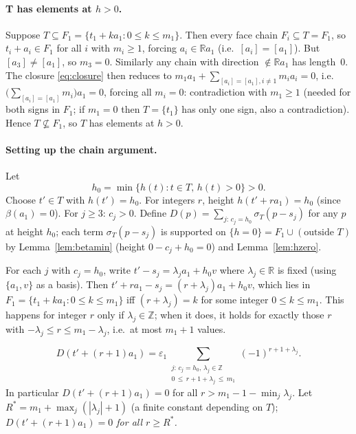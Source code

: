 \paragraph{T has elements at $h>0$.}
Suppose $T\subseteq F_1=\{t_1+ka_1:0\le k\le m_1\}$.
Then every face chain $F_i\subseteq T=F_1$, so
$t_i+a_i\in F_1$ for all $i$ with $m_i\ge1$, forcing $a_i\in\mathbb{R}a_1$ (i.e.\ $[a_i]=[a_1]$).
But $[a_3]\ne[a_1]$, so $m_3=0$.  Similarly any chain with direction $\not\in\mathbb{R}a_1$ has length~$0$.
The closure \eqref{eq:closure} then reduces to $m_1 a_1+\sum_{[a_i]=[a_1],i\ne1}m_i a_i=0$,
i.e.\ $\bigl(\sum_{[a_i]=[a_1]}m_i\bigr)a_1=0$, forcing all $m_i=0$: contradiction with $m_1\ge1$
(needed for both signs in $F_1$; if $m_1=0$ then $T=\{t_1\}$ has only one sign, also a contradiction).
Hence $T\not\subseteq F_1$, so $T$ has elements at $h>0$.

\paragraph{Setting up the chain argument.}
Let
\[
  h_0=\min\{h(t):t\in T,\,h(t)>0\}>0.
\]
Choose $t'\in T$ with $h(t')=h_0$.
For integers $r$, height $h(t'+ra_1)=h_0$ (since $\beta(a_1)=0$).
For $j\ge3$: $c_j>0$.
Define $D(p)=\sum_{j:\,c_j=h_0}\sigma_T(p-s_j)$ for any $p$ at height $h_0$;
each term $\sigma_T(p-s_j)$ is supported on $\{h=0\}=F_1\cup(\text{outside }T)$
by Lemma~\ref{lem:betamin} (height $0-c_j+h_0=0$) and Lemma~\ref{lem:hzero}.

For each $j$ with $c_j=h_0$, write $t'-s_j=\lambda_j a_1+h_0 v$ where
$\lambda_j\in\mathbb{R}$ is fixed (using $\{a_1,v\}$ as a basis).
Then $t'+ra_1-s_j=(r+\lambda_j)a_1+h_0 v$, which lies in
$F_1=\{t_1+ka_1:0\le k\le m_1\}$ iff $(r+\lambda_j)=k$ for some integer $0\le k\le m_1$.
This happens for integer $r$ only if $\lambda_j\in\mathbb{Z}$; when it does, it holds for
exactly those $r$ with $-\lambda_j\le r\le m_1-\lambda_j$, i.e.\ at most $m_1+1$ values.

\begin{equation}\label{eq:Dform}
  D(t'+(r+1)a_1)
  =\varepsilon_1\!\!\sum_{\substack{j:\,c_j=h_0,\,\lambda_j\in\mathbb{Z}\\ 0\,\le\, r+1+\lambda_j\,\le\, m_1}}\!\!
  (-1)^{r+1+\lambda_j}.
\end{equation}
In particular $D(t'+(r+1)a_1)=0$ for all $r>m_1-1-\min_j\lambda_j$.
Let $R^*=m_1+\max_j(|\lambda_j|+1)$ (a finite constant depending on $T$);
\emph{$D(t'+(r+1)a_1)=0$ for all $r\ge R^*$.}

